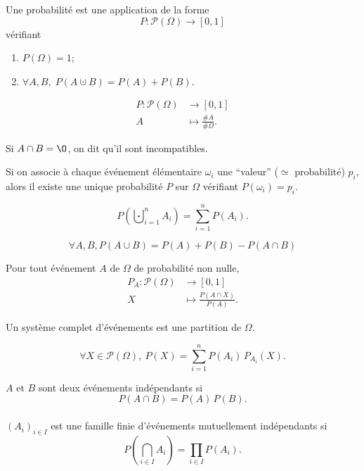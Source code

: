 \begin{multicols}{2}
	\begin{recap-box}
		Une probabilité est une application de la forme \[
			P : \mathcal{P}(\Omega) \longrightarrow [0,1]
		\] vérifiant
		\begin{enumerate}
			\item $P(\Omega) = 1$;
			\item $\forall A, B,\;P(A \cupdot B) = P(A) + P(B)$.
		\end{enumerate}
	\end{recap-box}
	\begin{recap-box}[frametitle={Équiprobabilité}]
		\begin{align*}
			P: \mathcal{P}(\Omega) &\longrightarrow [0,1] \\
			A &\longmapsto \frac{\#A}{\#\Omega}.
		\end{align*}
	\end{recap-box}
	\begin{recap-box}
		Si $A \cap B = \O$, on dit qu'il sont incompatibles.
	\end{recap-box}
	\begin{recap-box}
		Si on associe à chaque événement élémentaire $\omega_i$ une ``valeur'' ($\simeq$ probabilité) $p_i$, alors il existe une unique probabilité $P$ sur $\Omega$ vérifiant $P(\omega_i) = p_i$.
	\end{recap-box}
	\begin{recap-box}
		\[
			P\left( \bigcupdot_{i=1}^n A_i \right) = \sum_{i=1}^n P(A_i)
		.\]
	\end{recap-box}
	\begin{recap-box}
		\[
			\forall A,B,P(A\cup B) = P(A) + P(B) - P(A\cap B)
		\]
	\end{recap-box}
	\begin{recap-box}[frametitle={Probabilité conditionnelle}]
		Pour tout événement $A$ de $\Omega$ de probabilité non nulle, \begin{align*}
			P_A: \mathcal{P}(\Omega) &\longrightarrow [0,1] \\
			X &\longmapsto \frac{P(A\cap X)}{P(A)}.
		\end{align*}
	\end{recap-box}
	\begin{recap-box}
		Un système complet d'événements est une partition de $\Omega$.
	\end{recap-box}
	\begin{recap-box}[frametitle={Probabilités totales}]
		\[\forall X \in \mathcal{P}(\Omega),\:P(X) = \sum_{i=1}^n P(A_i)\,P_{A_i}(X).\]
	\end{recap-box}
	\begin{recap-box}
		$A$ et $B$ sont deux événements indépendants si \[
			P(A \cap B) = P(A)\,P(B)
		.\]~\\
		$(A_i)_{i \in I}$ est une famille finie d'événements mutuellement indépendants si \[
			P\left( \bigcap_{i \in  I} A_i \right) = \prod_{i \in I} P(A_i)
		.\]
	\end{recap-box}
\end{multicols}

